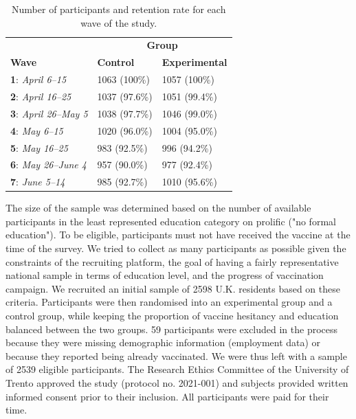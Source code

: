 \documentclass[authordate, empirical]{jote-new-article}
\begin{document}
	\begin{table}
		\begin{fullwidth}
		\caption{Number of participants and retention rate for each wave of the study.}
		\begin{tabularx}{\linewidth}{@{} X X X @{}}
			&\multicolumn{2}{c}{\textbf{Group}}\\
			\textbf{Wave}&\textbf{Control}&\textbf{Experimental}\\
			\hline \textbf{1}: \emph{April 6–15} & 1063 (100\%) & 1057 (100\%) \\

			 \textbf{2}: \emph{April 16–25} & 1037 (97.6\%) & 1051 (99.4\%) \\

			 \textbf{3}: \emph{April 26–May 5} & 1038 (97.7\%) & 1046 (99.0\%) \\

			 \textbf{4}: \emph{May 6–15} & 1020 (96.0\%) & 1004 (95.0\%) \\

			 \textbf{5}: \emph{May 16–25} & 983 (92.5\%) & 996 (94.2\%) \\

			 \textbf{6}: \emph{May 26–June 4} & 957 (90.0\%) & 977 (92.4\%) \\

			 \textbf{7}: \emph{June 5–14} & 985 (92.7\%) & 1010 (95.6\%) \\


		\end{tabularx}
	\end{fullwidth}
	\end{table}

	The size of the sample was determined based on the number of available participants in the least represented education category on prolific ("no formal education"). To be eligible, participants must not have received the vaccine at the time of the survey. We tried to collect as many participants as possible given the constraints of the recruiting platform, the goal of having a fairly representative national sample in terms of education level, and the progress of vaccination campaign. We recruited an initial sample of 2598 U.K. residents based on these criteria. Participants were then randomised into an experimental group and a control group, while keeping the proportion of vaccine hesitancy and education balanced between the two groups. 59 participants were excluded in the process because they were missing demographic information (employment data) or because they reported being already vaccinated. We were thus left with a sample of 2539 eligible participants. The Research Ethics Committee of the University of Trento approved the study (protocol no. 2021-001) and subjects provided written informed consent prior to their inclusion. All participants were paid for their time.
\end{document}
